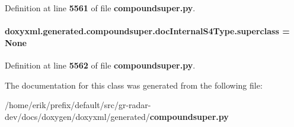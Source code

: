 Definition at line {\bf 5561} of file {\bf compoundsuper.\+py}.

\paragraph[{superclass}]{\setlength{\rightskip}{0pt plus 5cm}doxyxml.\+generated.\+compoundsuper.\+doc\+Internal\+S4\+Type.\+superclass = None\hspace{0.3cm}{\ttfamily [static]}}\label{classdoxyxml_1_1generated_1_1compoundsuper_1_1docInternalS4Type_ad91a40b7fe73f0c8244824f190a967da}


Definition at line {\bf 5562} of file {\bf compoundsuper.\+py}.



The documentation for this class was generated from the following file\+:\begin{DoxyCompactItemize}
\item 
/home/erik/prefix/default/src/gr-\/radar-\/dev/docs/doxygen/doxyxml/generated/{\bf compoundsuper.\+py}\end{DoxyCompactItemize}
